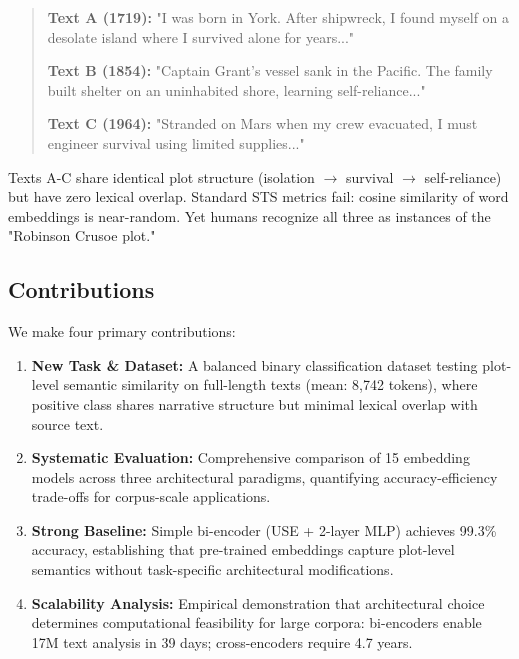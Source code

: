 \documentclass[11pt,a4paper]{article}
\begin{document}
\begin{quote}
\small
\textbf{Text A (1719):} "I was born in York. After shipwreck, I found myself on a desolate island where I survived alone for years..."

\textbf{Text B (1854):} "Captain Grant's vessel sank in the Pacific. The family built shelter on an uninhabited shore, learning self-reliance..."

\textbf{Text C (1964):} "Stranded on Mars when my crew evacuated, I must engineer survival using limited supplies..."
\end{quote}

Texts A-C share identical plot structure (isolation $\rightarrow$ survival $\rightarrow$ self-reliance) but have zero lexical overlap. Standard STS metrics fail: cosine similarity of word embeddings is near-random. Yet humans recognize all three as instances of the "Robinson Crusoe plot."

\subsection{Contributions}

We make four primary contributions:

\begin{enumerate}
    \item \textbf{New Task \& Dataset:} A balanced binary classification dataset testing plot-level semantic similarity on full-length texts (mean: 8,742 tokens), where positive class shares narrative structure but minimal lexical overlap with source text.

    \item \textbf{Systematic Evaluation:} Comprehensive comparison of 15 embedding models across three architectural paradigms, quantifying accuracy-efficiency trade-offs for corpus-scale applications.

    \item \textbf{Strong Baseline:} Simple bi-encoder (USE + 2-layer MLP) achieves 99.3\% accuracy, establishing that pre-trained embeddings capture plot-level semantics without task-specific architectural modifications.

    \item \textbf{Scalability Analysis:} Empirical demonstration that architectural choice determines computational feasibility for large corpora: bi-encoders enable 17M text analysis in 39 days; cross-encoders require 4.7 years.
\end{enumerate}
\end{document}
